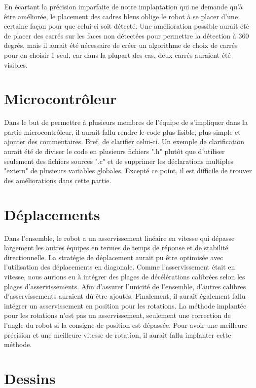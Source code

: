En écartant la précision imparfaite de notre implantation qui ne demande qu'à être améliorée, le placement des cadres bleus oblige le robot à se placer d'une certaine façon pour que celui-ci soit détecté. Une amélioration possible aurait été de placer des carrés sur les faces non détectées pour permettre la détection à 360 degrés, mais il aurait été nécessaire de créer un algorithme de choix de carrés pour en choisir 1 seul, car dans la plupart des cas, deux carrés auraient été visibles.

\section{Microcontrôleur}
Dans le but de permettre à plusieurs membres de l'équipe de s'impliquer dans la partie microcontrôleur, il aurait fallu rendre le code plus lisible, plus simple et ajouter des commentaires. Bref, de clarifier celui-ci. Un exemple de clarification aurait été de diviser le code en plusieurs fichiers ".h" plutôt que d'utiliser seulement des fichiers sources ".c" et de supprimer les déclarations multiples "extern" de plusieurs variables globales. Excepté ce point, il est difficile de trouver des améliorations dans cette partie.

\section{Déplacements}

Dans l'ensemble, le robot a un asservissement linéaire en vitesse qui dépasse largement les autres équipes en termes de temps de réponse et de stabilité directionnelle. La stratégie de déplacement aurait pu être optimisée avec l'utilisation des déplacements en diagonale. Comme l'asservissement était en vitesse, nous aurions eu à intégrer des plages de décélérations calibrées selon les plages d'asservissements. Afin d'assurer l'unicité de l'ensemble, d'autres calibres d'asservissements auraient dû être ajoutés. Finalement, il aurait également fallu intégrer un asservissement en position pour les rotations. La méthode implantée pour les rotations n'est pas un asservissement, seulement une correction de l'angle du robot si la consigne de position est dépassée. Pour avoir une meilleure précision et une meilleure vitesse de rotation, il aurait fallu implanter cette méthode.

\section{Dessins}

